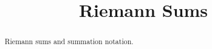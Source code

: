\documentclass{ximera}
\title{Riemann Sums}
\begin{document}
\begin{abstract}
Riemann sums and summation notation.
\end{abstract}
\maketitle






 
\begin{onlineOnly}
    \begin{center}
\end{center}
\end{onlineOnly}
\end{document}
